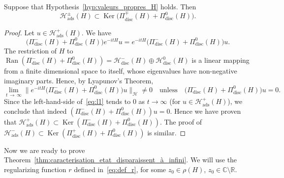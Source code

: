 \documentclass[AHL,Unicode,longabstracts,published]{cedram}
\newcommand{\Hi}{\mathcal{H}}
\newcommand{\bbC}{\mathbb{C}}
\newcommand{\R}{\mathbb{R}}
\newcommand{\ads}{\mathrm{ads}}
\newcommand{\disc}{\mathrm{disc}}
\DeclareMathOperator{\Ran}{Ran}
\DeclareMathOperator{\Ker}{Ker}
\newcommand*\bbC{\mathbb{C}}
\newcommand{\Hi}{\mathcal{H}}
\newcommand{\R}{\mathbb{R}}
\begin{document}
\begin{lemm}\label{lm:incl}
Suppose that Hypothesis~\ref{hyp:valeurs_propres_H} holds. Then
\begin{equation*}
\Hi_\ads^\pm(H)\subset \Ker\big(\Pi_{\disc}^\mp(H)+\Pi_{\disc}^0(H)\big).
\end{equation*}
\end{lemm}

\begin{proof}
Let $u\in \Hi_\ads^+(H)$. We have
\begin{equation}\label{eq:l1}
\big(\Pi_{\disc}^-(H)+\Pi_{\disc}^0(H)\big)e^{-itH}u=e^{-itH}\big(\Pi_{\disc}^-(H)+\Pi_{\disc}^0(H)\big)u.
\end{equation}
The restriction of $H$ to $\Ran(\Pi_{\disc}^-(H)+\Pi_{\disc}^0(H))=\Hi_{\disc}^-(H)\oplus\Hi_{\disc}^0(H)$ is a linear mapping from a finite dimensional space to itself, whose eigenvalues have non-negative imaginary parts. Hence, by Lyapunov's Theorem,
\begin{equation*}
\lim_{t\,\to\,\infty}\big\|e^{-itH}\big(\Pi_{\disc}^-(H)+\Pi_{\disc}^0(H)\big)u\big\|_\Hi\neq0 \quad \text{unless}\quad \big(\Pi_{\disc}^-(H)+\Pi_{\disc}^0(H)\big)u=0.
\end{equation*}
Since the left-hand-side of~\eqref{eq:l1} tends to $0$ as $t\to\infty$ (for $u\in \Hi_\ads^+(H)$), we conclude that indeed $(\Pi_{\disc}^-(H)+\Pi_{\disc}^0(H))u=0$. Hence we have proven that $\Hi_\ads^+(H)\subset \Ker(\Pi_{\disc}^-(H)+\Pi_{\disc}^0(H))$. The proof of $\Hi_\ads^-(H)\subset \Ker(\Pi_{\disc}^+(H)+\Pi_{\disc}^0(H))$ is similar.
\end{proof}

Now we are ready to prove Theorem~\ref{thm:caracterisation_etat_disparaissent_à_infini}. We will use the regularizing function $r$ defined in~\eqref{eq:def_r}, for some $z_0\in\rho(H)$, $z_0\in\bbC\setminus\R$.
\end{document}
